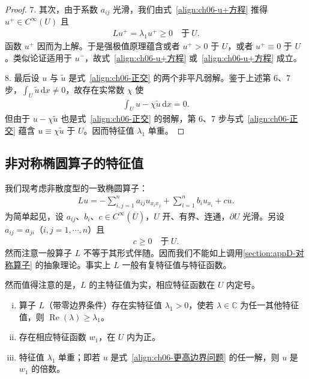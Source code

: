 \documentclass[../../main.tex]{subfiles}
\begin{document}
\begin{proof}
7. 其次，由于系数 $a_{ij}$ 光滑，我们由式~\eqref{align:ch06-u+方程} 推得 $u^{+}\in C^{\infty}(U)$ 且
\begin{align*}
Lu^{+}=\lambda_{1}u^{+}\geqslant 0\quad\text{于}\ U.
\end{align*}
函数 $u^{+}$ 因而为上解。于是强极值原理蕴含或者 $u^{+}>0$ 于 $U$，或者 $u^{+}\equiv 0$ 于 $U$。类似论证适用于 $u^{-}$，故式~\eqref{align:ch06-u+方程} 或~\eqref{align:ch06-u+方程} 成立。

8. 最后设 $u$ 与 $\widetilde{u}$ 是式~\eqref{align:ch06-正交} 的两个非平凡弱解。鉴于上述第 6、7 步，$\int_{U}\widetilde{u}\,\mathrm{d}x\neq 0$，故存在实常数 $\chi$ 使
\begin{align}
\int_{U}u-\chi\widetilde{u}\,\mathrm{d}x=0.
\end{align}
但由于 $u-\chi\widetilde{u}$ 也是式~\eqref{align:ch06-正交} 的弱解，第 6、7 步与式~\eqref{align:ch06-正交} 蕴含 $u\equiv\chi\widetilde{u}$ 于 $U$。因而特征值 $\lambda_{1}$ 单重。
\end{proof}

\subsection{非对称椭圆算子的特征值}\label{subsection:ch06-非对称算子特征值}

我们现考虑非散度型的一致椭圆算子：
\begin{align*}
Lu=-\sum_{i,j=1}^{n}a_{ij}u_{x_{i}x_{j}}+\sum_{i=1}^{n}b_{i}u_{x_{i}}+cu.
\end{align*}
为简单起见，设 $a_{ij}$、$b_{i}$、$c\in C^{\infty}(\overline{U})$，$U$ 开、有界、连通，$\partial U$ 光滑。另设 $a_{ij}=a_{ji}$（$i,j=1,\cdots,n$）且
\begin{align}
c\geqslant 0\quad\text{于}\ U.
\end{align}
然而注意一般算子 $L$ 不等于其形式伴随。因而我们不能如上调用\cref{section:appD-对称算子} 的抽象理论。事实上 $L$ 一般有复特征值与特征函数。

然而值得注意的是，$L$ 的主特征值为实，相应特征函数在 $U$ 内定号。

\begin{theorem}[非对称椭圆算子的主特征值]\label{theorem:ch06-非对称主特征值}
\begin{enumerate}[(i)]
\item 算子 $L$（带零边界条件）存在实特征值 $\lambda_{1}>0$，使若 $\lambda\in\mathbb{C}$ 为任一其他特征值，则 $\operatorname{Re}(\lambda)\geqslant\lambda_{1}$。
\item 存在相应特征函数 $w_{1}$，在 $U$ 内为正。
\item 特征值 $\lambda_{1}$ 单重；即若 $u$ 是式~\eqref{align:ch06-更高边界问题} 的任一解，则 $u$ 是 $w_{1}$ 的倍数。
\end{enumerate}
\end{theorem}
\end{document}

